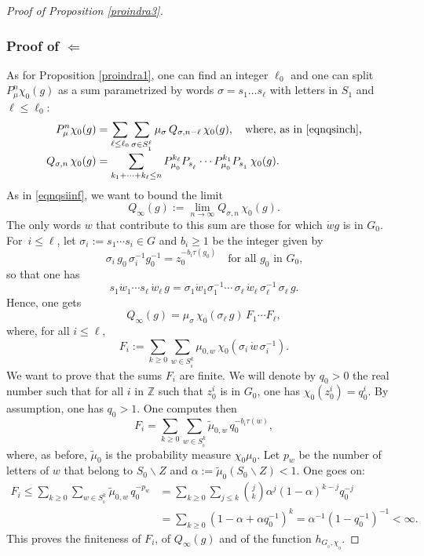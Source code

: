\documentclass[JEP,XML,SOM,Unicode]{cedram}
\theoremstyle{definition}
\newcommand{\m}[1]{\mathbb{ #1}}
\let\al\alpha
\let\si\sigma
\let\ra\to
\begin{document}
\begin{proof}[Proof of Proposition \ref{proindra3}]
\subsubsection*{Proof of $\Leftarrow$}
As for Proposition \ref{proindra1},
one can find an integer $\ell_0$ and one can split $P^n_\mu\chi_0(g)$
as a sum parametrized by words $\si=s_1\ldots s_\ell$ with letters in $S_1$
and $\ell\leq \ell_0$:\vspace*{-3pt}
\begin{align*}
P^n_\mu\chi_0(g)
&=
\sum_{\ell\leq \ell_0}\sum_{\si\in S_{_1}^\ell}
\mu_\si\,Q_{\si,n-\ell}\,\chi_0(g),
\quad\text{where, as in \eqref{eqnqsinch},}\\[-3pt]
Q_{\si,n}\,\chi_0(g)
&=
\sum_{k_1+\cdots +k_\ell\leq n}
P^{k_\ell}_{\mu_{_0}}P_{s_{_\ell}}\cdots
P^{k_1}_{\mu_{_0}}P_{s_{_1}}\,\chi_0(g).
\end{align*}
As in \eqref{eqnqsiinf}, we want to bound the limit\vspace*{-3pt}
\[
Q_\infty(g)
:=
\lim_{n\ra\infty}
Q_{\si,n}\,\chi_0(g).
\]
The only words $w$ that contribute to this sum are those for which
$\dot{w}g$ is in $G_0$.
For~$i\leq \ell$, let $\si_i:=s_1\cdots s_i\in G$ and $b_i\geq 1$ be the integer given by\vspace*{-3pt}
\[
\si_i\,g_0\,\si_i^{-1}g_0^{-1}=z_0^{-b_i\tau(g_0)}
\quad\text{for all $g_0$ in $G_0$,}
\]
so that one has\vspace*{-3pt}
\begin{equation}
\label{eqnswswg2}
s_1\dot{w}_{1}\cdots s_\ell\, \dot{w}_{\ell}\, g
=
\si_1\dot{w}_{1}\si_1^{-1}\cdots\, \si_{\ell}\,\dot{w}_{\ell}\,\si_\ell^{-1}\,\si_\ell\, g.
\end{equation}
Hence, one gets\vspace*{-3pt}
\[
Q_\infty(g)
=\mu_\si\,\chi_0(\si_\ell\, g)\,F_1\cdots F_\ell,
\]
where, for all $i\leq \ell$,\vspace*{-3pt}
\[
F_i:=
\sum_{k\geq 0}
\sum_{w\in S^{k}_{_0}}
\mu_{0,w}\, \chi_0(\si_i\, \dot{w}\,\si^{-1}_i).
\]
We want to prove that the sums $F_i$ are finite.
We will denote by $q_0>0$ the real number such that
for all $i$ in $\m Z$ such that $z_0^i$ is in $G_0$, one has
$\chi_0(z_0^i)=q_0^i.$
By assumption, one has $q_0>1$. One computes then\vspace*{-3pt}
\[
F_i
=
\sum_{k\geq 0}
\sum_{w\in S^{k}_{_0}}
\widetilde{\mu}_{0,w}\, q_0^{-b_i\tau(\dot{w})},
\]
where, as before, $\widetilde{\mu}_0$ is the probability
measure $\chi_0\mu_0$.
Let $p_w$ be the number of letters of $w$ that belong to $S_0\smallsetminus Z$
and $\al:=\widetilde{\mu}_0(S_0\smallsetminus Z)<1$.
One goes on:\vspace*{-3pt}
\begin{align*}
F_i
\leq
\sum_{k\geq 0}
\sum_{w\in S^{k}_{_0}}
\widetilde{\mu}_{0,w}\, q_0^{-p_w}
&=\sum_{k\geq 0}
\sum_{j\leq k}
\binom{j}{k}\al^j(1-\al )^{k-j}q_0^{-j}\\[-3pt]
&=
\sum_{k\geq 0}
(1-\al+\al q_0^{-1})^k
= \al^{-1}(1-q_0^{-1})^{-1}< \infty.
\end{align*}
This proves the finiteness of $F_i$, of $Q_\infty(g)$ and of the function $h_{G_{_0},\chi_{_0}}$.
\end{proof}
\end{document}
